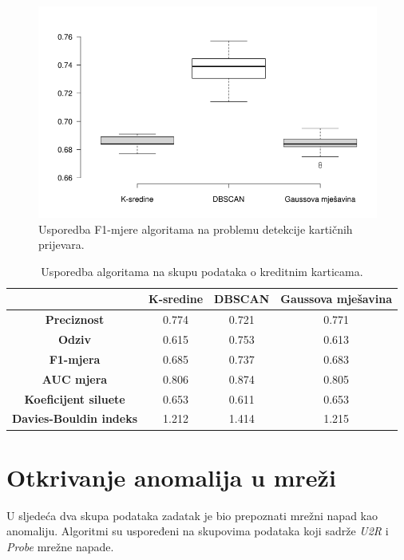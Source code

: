 \documentclass[utf8, diplomski, numeric]{fer}
\begin{document}
\begin{figure}[htb]
\includegraphics[width=1\textwidth]{images/credit-f1.png}
\centering
\caption{Usporedba F1-mjere algoritama na problemu detekcije kartičnih prijevara.}
\label{fig:credit-f1}
\end{figure}

\begin{table}[h!]
  \begin{center}
    \caption{Usporedba algoritama na skupu podataka o kreditnim karticama.}
    \label{tab:credit}
    \begin{tabular}{c|c|c|c} 
      & \textbf{K-sredine} & \textbf{DBSCAN}  & \textbf{Gaussova mješavina}\\
      \hline
      \textbf{Preciznost} & 0.774 & 0.721 & 0.771 \\
      \textbf{Odziv} & 0.615 & 0.753 & 0.613 \\
      \textbf{F1-mjera} & 0.685 & 0.737 & 0.683 \\
      \textbf{AUC mjera} & 0.806 & 0.874 & 0.805 \\
       \textbf{Koeficijent siluete} & 0.653 & 0.611 & 0.653 \\
       \textbf{Davies-Bouldin indeks} & 1.212 & 1.414 & 1.215 \\
     \end{tabular}
  \end{center}
\end{table}

\section{Otkrivanje anomalija u mreži}
U sljedeća dva skupa podataka zadatak je bio prepoznati mrežni napad kao anomaliju. Algoritmi su uspoređeni na skupovima podataka koji sadrže \textit{U2R} i \textit{Probe} mrežne napade.
\end{document}
